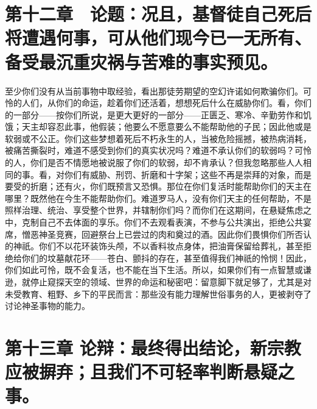 
\section{第十二章　论题：况且，基督徒自己死后将遭遇何事，可从他们现今已一无所有、备受最沉重灾祸与苦难的事实预见。}

至少你们没有从当前事物中取经验，看出那徒劳期望的空幻许诺如何欺骗你们。可怜的人们，从你们的命运，趁着你们还活着，想想死后什么在威胁你们。看，你们的一部分——按你们所说，是更大更好的一部分——正匮乏、寒冷、辛勤劳作和饥饿；天主却容忍此事，他假装；他要么不愿意要么不能帮助他的子民；因此他或是软弱或不公正。你们这些梦想着死后不朽永生的人，当被危险摇撼，被热病消耗，被痛苦撕裂时，难道不感受到你们的真实状况吗？难道不承认你们的软弱吗？可怜的人，你们是否不情愿地被说服了你们的软弱，却不肯承认？但我忽略那些人人相同的事。看，对你们有威胁、刑罚、折磨和十字架；这些不再是崇拜的对象，而是要受的折磨；还有火，你们既预言又恐惧。那位在你们复活时能帮助你们的天主在哪里？既然他在今生不能帮助你们。难道罗马人，没有你们天主的任何帮助，不是照样治理、统治、享受整个世界，并辖制你们吗？而你们在这期间，在悬疑焦虑之中，克制自己不去体面的享乐。你们不去观看表演，不参与公共演出，拒绝公共宴席，憎恶神圣竞赛，回避祭台上已尝过的肉和奠过的酒。因此你们畏惧你们所否认的神祇。你们不以花环装饰头颅，不以香料妆点身体，把油膏保留给葬礼，甚至拒绝给你们的坟墓献花环——苍白、颤抖的存在，甚至值得我们神祇的怜悯！因此，你们如此可怜，既不会复活，也不能在当下生活。所以，如果你们有一点智慧或谦逊，就停止窥探天空的领域、世界的命运和秘密吧：留意脚下就足够了，尤其是对未受教育、粗野、乡下的平民而言：那些没有能力理解世俗事务的人，更被剥夺了讨论神圣事物的能力。\par


\section{第十三章 论辩：最终得出结论，新宗教应被摒弃；且我们不可轻率判断悬疑之事。}

\par

